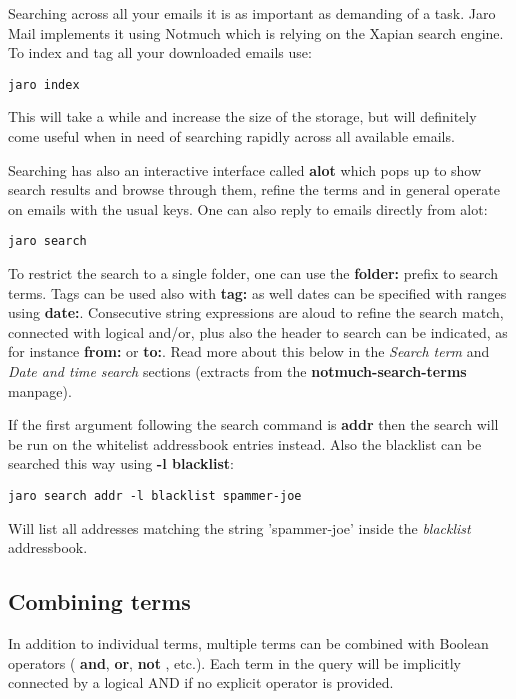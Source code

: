\documentclass[a4,onecolumn,portrait]{article}
\begin{document}
Searching across all your emails it is as important as demanding of a task. Jaro Mail implements it using Notmuch which is relying on the Xapian search engine. To index and tag all your downloaded emails use:

\begin{verbatim}
jaro index
\end{verbatim}

This will take a while and increase the size of the storage, but will definitely come useful when in need of searching rapidly across all available emails.

Searching has also an interactive interface called \textbf{alot} which pops up to show search results and browse through them, refine the terms and in general operate on emails with the usual keys. One can also reply to emails directly from alot:

\begin{verbatim}
jaro search
\end{verbatim}

To restrict the search to a single folder, one can use the \textbf{folder:} prefix to search terms. Tags can be used also with \textbf{tag:} as well dates can be specified with ranges using \textbf{date:}. Consecutive string expressions are aloud to refine the search match, connected with logical and/or, plus also the header to search can be indicated, as for instance \textbf{from:} or \textbf{to:}. Read more about this below in the \emph{Search term} and \emph{Date and time search} sections (extracts from the \textbf{notmuch-search-terms} manpage).


If the first argument following the search command is \textbf{addr} then the search will be run on the whitelist addressbook entries instead. Also the blacklist can be searched this way using \textbf{-l blacklist}:

\begin{verbatim}
jaro search addr -l blacklist spammer-joe
\end{verbatim}

Will list all addresses matching the string 'spammer-joe' inside the \emph{blacklist} addressbook.

\subsection{Combining terms}
\label{sec-8-1}

In addition to individual terms, multiple terms can be combined with Boolean operators ( \textbf{and}, \textbf{or}, \textbf{not} , etc.). Each term in the query will be implicitly connected by a logical AND if no explicit operator is provided.
\end{document}
